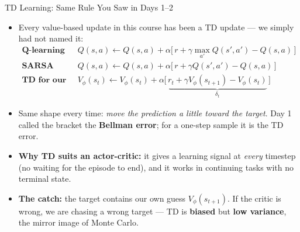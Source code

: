 \begin{frame}{TD Learning: Same Rule You Saw in Days 1--2}
\begin{itemize}
    \item Every value-based update in this course has been a TD update --- we simply had not named it:
    \begin{align*}
        \textbf{Q-learning (Day 1):}\quad & Q(s,a) \leftarrow Q(s,a) + \alpha \big[\, r + \gamma \max_{a'} Q(s',a') - Q(s,a) \,\big] \\
        \textbf{SARSA (Day 2):}\quad & Q(s,a) \leftarrow Q(s,a) + \alpha \big[\, r + \gamma Q(s',a') - Q(s,a) \,\big] \\
        \textbf{TD for our critic:}\quad & V_\phi(s_t) \leftarrow V_\phi(s_t) + \alpha \big[\, \underbrace{r_t + \gamma V_\phi(s_{t+1}) - V_\phi(s_t)}_{\delta_t} \,\big]
    \end{align*}
    \item Same shape every time: \emph{move the prediction a little toward the target}. Day 1 called the bracket the \textbf{Bellman error}; for a one-step sample it is the TD error.
    \pause
    \item \textbf{Why TD suits an actor-critic:} it gives a learning signal at \emph{every} timestep (no waiting for the episode to end), and it works in continuing tasks with no terminal state.
    \item \textbf{The catch:} the target contains our own guess $V_\phi(s_{t+1})$. If the critic is wrong, we are chasing a wrong target --- TD is \textbf{biased} but \textbf{low variance}, the mirror image of Monte Carlo.
\end{itemize}
\end{frame}

